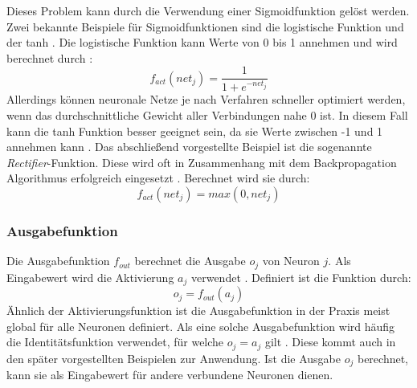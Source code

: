 Dieses Problem kann durch die Verwendung einer Sigmoidfunktion gelöst werden. Zwei bekannte Beispiele für Sigmoidfunktionen sind die logistische Funktion und der \ac{tanh} \cite{lecun2012efficient}. Die logistische Funktion kann Werte von 0 bis 1 annehmen und wird berechnet durch \cite{kriesel2008kleiner}: 
$$f_{act}(net_j)=\frac{1}{1+e^{-net_j}}$$
Allerdings können neuronale Netze je nach Verfahren schneller optimiert werden, wenn das durchschnittliche Gewicht aller Verbindungen nahe 0 ist. In diesem Fall kann die \ac{tanh} Funktion besser geeignet sein, da sie Werte zwischen -1 und 1 annehmen kann \cite{lecun2012efficient}. Das abschließend vorgestellte Beispiel ist die sogenannte \emph{Rectifier}-Funktion. Diese wird oft in Zusammenhang mit dem Backpropagation Algorithmus erfolgreich eingesetzt \cite{glorot2011deep}. Berechnet wird sie durch:
$$f_{act}(net_j)= max(0, net_j)$$

\subsubsection{Ausgabefunktion}
Die Ausgabefunktion $f_{out}$ berechnet die Ausgabe $o_j$ von Neuron $j$. Als Eingabewert wird die Aktivierung $a_j$ verwendet \cite{zell2003simulation}. Definiert ist die Funktion durch:
$$o_j = f_{out}(a_j)$$
Ähnlich der Aktivierungsfunktion ist die Ausgabefunktion in der Praxis meist global für alle Neuronen definiert. Als eine solche Ausgabefunktion wird häufig die Identitätsfunktion verwendet, für welche $o_j = a_j$ gilt \cite{kriesel2008kleiner}. Diese kommt auch in den später vorgestellten Beispielen zur Anwendung. Ist die Ausgabe $o_j$ berechnet, kann sie als Eingabewert für andere verbundene Neuronen dienen.

